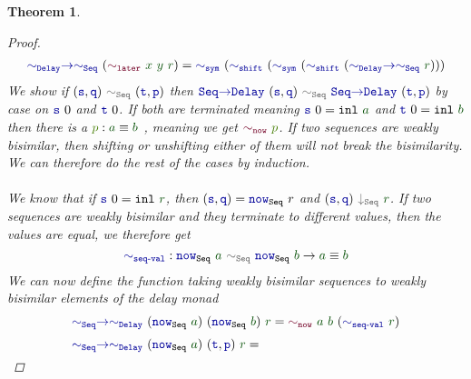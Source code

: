 \documentclass[twoside,11pt,openright]{report}
\theoremstyle{plain} %
\newtheorem{thm}{Theorem}[section]
\theoremstyle{definition}
\theoremstyle{remark}
\newcommand*{\term}[1]{\textcolor{green!30!black}{#1}} %
\newcommand*{\pathterm}[1]{\textcolor{green!65!red!75!black}{#1}}
\newcommand*{\relation}[1]{\textcolor{gray!75!black}{\ensuremath{\mathtt{#1}}}}
\newcommand*{\function}[1]{\textcolor{blue!60!black}{\ensuremath{\mathtt{#1}}}}
\newcommand*{\constructor}[1]{\textcolor{purple!60!black}{\ensuremath{\mathtt{#1}}}}
\begin{document}
\begin{thm}
\begin{proof}
\begin{equation}
\begin{aligned}
        &\function{{\sim}_{Delay}{\rightarrow}{\sim}_{Seq}}~(\constructor{\sim_{later}}~\term{x}~\term{y}~\term{r}) = \function{\sim_{sym}}~(\function{\sim_{shift}}~(\function{\sim_{sym}}~(\function{\sim_{shift}}~(\function{{\sim}_{Delay}{\rightarrow}{\sim}_{Seq}}~\term{r}))) \\
      \end{aligned}
    \end{equation}
    We show if \((\function{s},\function{q})~\relation{\sim_{Seq}}~(\function{t},\function{p})\) then \(\function{Seq{\rightarrow}Delay}~(\function{s},\function{q})~\relation{\sim_{Seq}}~\function{Seq{\rightarrow}Delay}~(\function{t},\function{p})\) by case on \(\function{s}~0\) and \(\function{t}~0\). If both are terminated meaning \(\function{s}~0 = \mathtt{inl}~\term{a}\) and \(\function{t}~0 = \mathtt{inl}~\term{b}\) then there is a \(\pathterm{p} : \term{a} \equiv \term{b}\) , meaning we get \(\constructor{\sim_{now}}~\pathterm{p}\). If two sequences are weakly bisimilar, then shifting or unshifting either of them will not break the bisimilarity. We can therefore do the rest of the cases by induction. 
    \\ \\
    We know that if \(\function{s}~0 = \mathtt{inl}~\term{r}\), then \((\function{s},\function{q}) = \function{now}_{\mathtt{Seq}}~r\) and \((\function{s},\function{q})~\relation{\downarrow_{Seq}}~\term{r}\). If two sequences are weakly bisimilar and they terminate to different values, then the values are equal, we therefore get
    \begin{equation}
      \function{\sim_{seq\text{-}val}} : \function{now}_{\mathtt{Seq}}~\term{a}~\relation{\sim_{Seq}}~\function{now}_{\mathtt{Seq}}~\term{b} \rightarrow \term{a} \equiv \term{b}
    \end{equation}
    We can now define the function taking weakly bisimilar sequences to weakly bisimilar elements of the delay monad
    \begin{equation}
      \begin{aligned}
        &\function{{\sim}_{Seq}{\rightarrow}{\sim}_{Delay}}~(\function{now}_{\mathtt{Seq}}~\term{a})~(\function{now}_{\mathtt{Seq}}~\term{b})~\term{r} = \constructor{\sim_{now}}~\term{a}~\term{b}~(\function{\sim_{seq\text{-}val}}~\term{r}) \\[1mm]
        &\function{{\sim}_{Seq}{\rightarrow}{\sim}_{Delay}}~(\function{now}_{\mathtt{Seq}}~\term{a})~(\function{t},\function{p})~\term{r} = \\[-1mm]

\end{aligned}
\end{equation}
\end{proof}
\end{thm}
\end{document}
